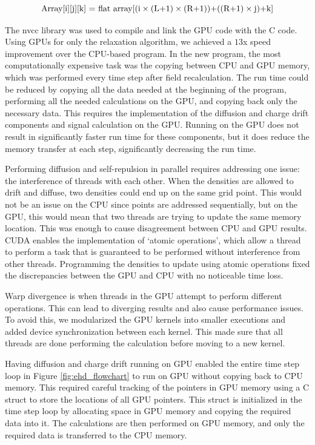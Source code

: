 \begin{equation}{\label{flat_array}}
 \text{Array[i][j][k] = flat array[(i} \times \text{(L+1)}\times \text{(R+1))+((R+1)}\times \text{j)+k]}
\end{equation}

The nvcc library was used to compile and link the GPU {\cpp} code with the {\ehd} C code. Using GPUs for only the relaxation algorithm, we achieved a $13$x speed improvement over the CPU-based program. In the new program, the most computationally expensive task was the copying between CPU and GPU memory, which was performed every time step after field recalculation. The run time could be reduced by copying all the data needed at the beginning of the program, performing all the needed calculations on the GPU, and copying back only the necessary data. This requires the implementation of the diffusion and charge drift components and signal calculation on the GPU. Running on the GPU does not result in significantly faster run time for these components, but it does reduce the memory transfer at each step, significantly decreasing the run time.

Performing diffusion and self-repulsion in parallel requires addressing one issue: the interference of threads with each other. When the densities are allowed to drift and diffuse, two densities could end up on the same grid point. This would not be an issue on the CPU since points are addressed sequentially, but on the GPU, this would mean that two threads are trying to update the same memory location. This was enough to cause disagreement between CPU and GPU results. CUDA enables the implementation of `atomic operations', which allow a thread to perform a task that is guaranteed to be performed without interference from other threads. Programming the densities to update using atomic operations fixed the discrepancies between the GPU and CPU with no noticeable time loss.

Warp divergence is when threads in the GPU attempt to perform different operations. This can lead to diverging results and also cause performance issues. To avoid this, we modularized the GPU kernels into smaller executions and added device synchronization between each kernel. This made sure that all threads are done performing the calculation before moving to a new kernel.

Having diffusion and charge drift running on GPU enabled the entire time step loop in Figure \ref{fig:ehd_flowchart} to run on GPU without copying back to CPU memory. This required careful tracking of the pointers in GPU memory using a C struct to store the locations of all GPU pointers. This struct is initialized in the time step loop by allocating space in GPU memory and copying the required data into it. The calculations are then performed on GPU memory, and only the required data is transferred to the CPU memory.

